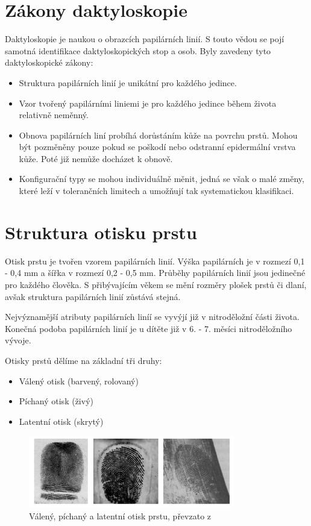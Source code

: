 \section{Zákony daktyloskopie}
Daktyloskopie je naukou o obrazcích papilárních linií. S touto vědou se pojí samotná identifikace daktyloskopických stop a osob.\cite{PolicieDaktyloskopie} Byly zavedeny tyto daktyloskopické zákony\cite{Drahansky}:
\begin{itemize}
    \item Struktura papilárních linií je unikátní pro každého jedince.
    \item Vzor tvořený papilárními liniemi je pro každého jedince během života relativně neměnný.
    \item Obnova papilárních liní probíhá dorůstáním kůže na povrchu prstů. Mohou být pozměněny pouze pokud se poškodí nebo odstranní epidermální vrstva kůže. Poté již nemůže docházet k obnově.
    \item Konfigurační typy se mohou individuálně měnit, jedná se však o malé změny, které leží v tolerančních limitech a umožňují tak systematickou klasifikaci.
\end{itemize}

\section{Struktura otisku prstu}
Otisk prstu je tvořen vzorem papilárních linií. Výška papilárních je v rozmezí 0,1 - 0,4 mm a šířka v rozmezí 0,2 - 0,5 mm.\cite{Drahansky} Průběhy papilárních linií jsou jedinečné pro každého člověka. S přibývajícím věkem se mění rozměry plošek prstů či dlaní, avšak struktura papilárních linií zůstává stejná.

Nejvýznamější atributy papilárních liníí se vyvýjí již v nitroděložní části života. Konečná podoba papilárních linií je u dítěte již v 6. - 7. měsíci nitroděložního vývoje.\cite{DrahanskyBrezinova}

Otisky prstů dělíme na základní tři druhy:\cite{Drahansky}
\begin{itemize}
\item Válený otisk (barvený, rolovaný)
\item Píchaný otisk (živý)
\item Latentní otisk (skrytý)
\end{itemize}

\begin{figure}[htbp]
    \centering
    \includegraphics[width=340px]{obrazky-figures/druhyotisk.png}
    \caption{Válený, píchaný a latentní otisk prstu, převzato z \cite{Drahansky}}
\end{figure}

